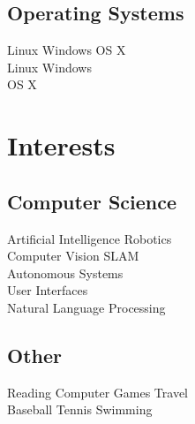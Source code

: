 \documentclass[a4paper]{awesome-deedy}
\begin{document}
\begin{minipage}[t]{0.33\textwidth}
\subsection{Operating Systems}
Linux \textbullet{} Windows \textbullet{} OS X \\
Linux \textbullet{} Windows \\
OS X \\
\sectionsep


\section{Interests}
\subsection{Computer Science}
Artificial Intelligence \textbullet{} Robotics \\
Computer Vision \textbullet{} SLAM \\
Autonomous Systems \\
User Interfaces \\
Natural Language Processing \\
\sectionsep

\subsection{Other}
Reading \textbullet{} Computer Games \textbullet{} Travel \\
Baseball \textbullet{} Tennis \textbullet{} Swimming \\
\sectionsep

%
%

\end{minipage} 
\hfill
\end{document}
